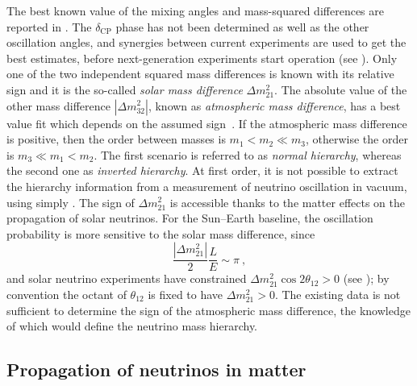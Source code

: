 The best known value of the mixing angles and mass-squared differences are reported in .
The $\delta_\text{CP}$ phase has not been determined as well as the other oscillation angles, %
and synergies between current experiments are used to get the best estimates, before %
next-generation experiments start operation (see ).
Only one of the two independent squared mass differences is known with its relative sign and %
it is the so-called \emph{solar mass difference} $\Delta m_{21}^2$.
The absolute value of the other mass difference $|\Delta m_{32}^2|$, %
known as \emph{atmospheric mass difference}, has a best value fit which depends on the assumed sign~\cite{Esteban:2018azc}.
If the atmospheric mass difference is positive, then the order between masses is $m_1 < m_2 \ll m_3$, %
otherwise the order is $m_3 \ll m_1 < m_2$.
The first scenario is referred to as \emph{normal hierarchy}, whereas the second one as \emph{inverted hierarchy}.
At first order, it is not possible to extract the hierarchy information from a measurement of neutrino oscillation in vacuum, %
using simply .
The sign of $\Delta m_{21}^2$ is accessible thanks to the matter effects on the propagation of solar neutrinos.
For the Sun--Earth baseline, the oscillation probability is more sensitive to the solar mass difference, since %
\begin{equation}
	\frac{|\Delta m_{21}^2|}{2} \frac{L}{E} \sim \pi\ ,
\end{equation}
and solar neutrino experiments have constrained $\Delta m_{21}^2 \cos 2\theta_{12} > 0$ (see );
by convention the octant of $\theta_{12}$ is fixed to have $\Delta m_{21}^2 > 0$.
The existing data is not sufficient to determine the sign of the atmospheric mass difference, 
the knowledge of which would define the neutrino mass hierarchy.



\subsection{Propagation of neutrinos in matter}
\label{sec:neutrino_matter}

